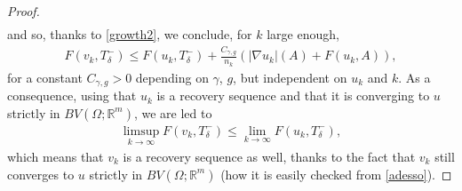 \documentclass[a4paper,11pt]{article}
\numberwithin{equation}{section}
\newcommand{\Om}{\Omega}
\def\det{\,{\rm det\ }}
\newcommand{\R}{\mathbb{R}}
\begin{document}
\begin{proof}
\begin{align*}
\end{align*}
and so, thanks to \eqref{growth2},  we conclude, for $k$ large enough,
\begin{align*}
	F(v_k,T_\delta^-)\leq 	F(u_k,T_\delta^-)+ \frac{C_{\gamma,g}}{n_k}\left(|\nabla u_k|(A)+F(u_k,A)\right),
\end{align*}
for a constant $C_{\gamma,g}>0$ depending on $\gamma$, $g$, but independent on $u_k$ and $k$.
%
As a consequence, using that $u_k$ is a recovery sequence and that it is  converging to $u$ strictly in $BV(\Om;\R^m)$, we are led to 
\begin{align*}
\limsup_{k\rightarrow \infty} 	F(v_k,T_\delta^-)\leq \lim_{k\rightarrow \infty} 	F(u_k,T_\delta^-),
\end{align*}
which means that $v_k$ is a recovery sequence as well, thanks to the fact that $v_k$ still converges to $u$ strictly in $BV(\Om;\R^m)$ (how it is easily checked from \eqref{adesso}).
\end{proof}
\end{document}
